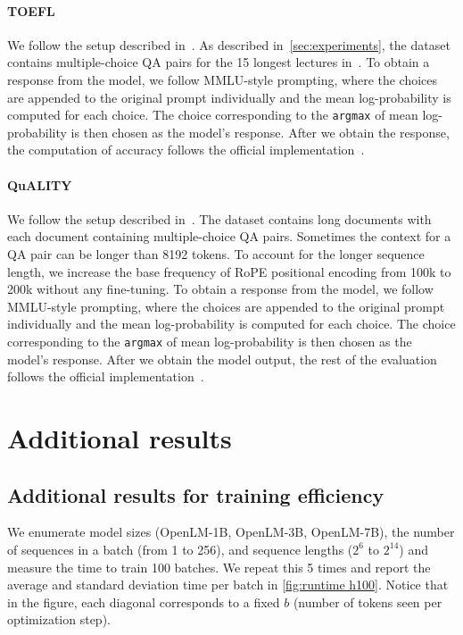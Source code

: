 \paragraph{TOEFL}
We follow the setup described in~\cite{an2023leval}. As described in~\cref{sec:experiments}, the dataset contains multiple-choice QA pairs for the 15 longest lectures in~\citep{tseng2016machine, chung-etal-2018-supervised}. To obtain a response from the model, we follow MMLU-style prompting, where the choices are appended to the original prompt individually and the mean log-probability is computed for each choice. The choice corresponding to the \texttt{argmax} of mean log-probability is then chosen as the model's response. After we obtain the response, the computation of accuracy follows the official implementation~\cite{an2023leval}.

\paragraph{QuALITY}
We follow the setup described in~\cite{an2023leval}. The dataset contains long documents with each document containing multiple-choice QA pairs. Sometimes the context for a QA pair can be longer than 8192 tokens. To account for the longer sequence length, we increase the base frequency of RoPE positional encoding from 100k to 200k without any fine-tuning. To obtain a response from the model, we follow MMLU-style prompting, where the choices are appended to the original prompt individually and the mean log-probability is computed for each choice. The choice corresponding to the \texttt{argmax} of mean log-probability is then chosen as the model's response. After we obtain the model output, the rest of the evaluation follows the official implementation~\cite{an2023leval}.   

\section{Additional results}\label{sec:additional_results}
\subsection{Additional results for training efficiency}\label{sec:additional_benchmark}
We enumerate model sizes (OpenLM-1B, OpenLM-3B, OpenLM-7B), the number of sequences in a batch (from 1 to 256), and sequence lengths ($2^6$ to $2^{14}$) and measure the time to train 100 batches. We repeat this 5 times and report the average and standard deviation time per batch in \cref{fig:runtime h100}. Notice that in the figure, each diagonal corresponds to a fixed $b$ (number of tokens seen per optimization step). 

